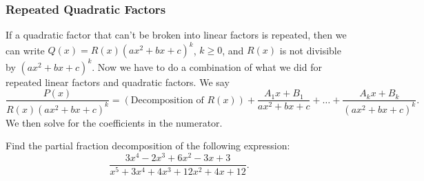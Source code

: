 \subsubsection{Repeated Quadratic Factors}
\noindent
If a quadratic factor that can't be broken into linear factors is repeated, then we can write
$Q(x) = R(x)(ax^2+bx+c)^k$, $k \geq 0$, and $R(x)$ is not divisible by $(ax^2+bx+c)^k$.
Now we have to do a combination of what we did for repeated linear factors and quadratic factors.
We say
\begin{equation*}
	\frac{P(x)}{R(x)(ax^2+bx+c)^k}=\left(\text{Decomposition of }R(x)\right)+\frac{A_1x+B_1}{ax^2+bx+c}+\ldots+\frac{A_kx+B_k}{(ax^2+bx+c)^k}.
\end{equation*}
We then solve for the coefficients in the numerator.

\begin{example}
	Find the partial fraction decomposition of the following expression:
	\begin{equation*}
		\frac{3x^4-2x^3+6x^2-3x+3}{x^5+3x^4+4x^3+12x^2+4x+12}.
	\end{equation*}
\end{example}
